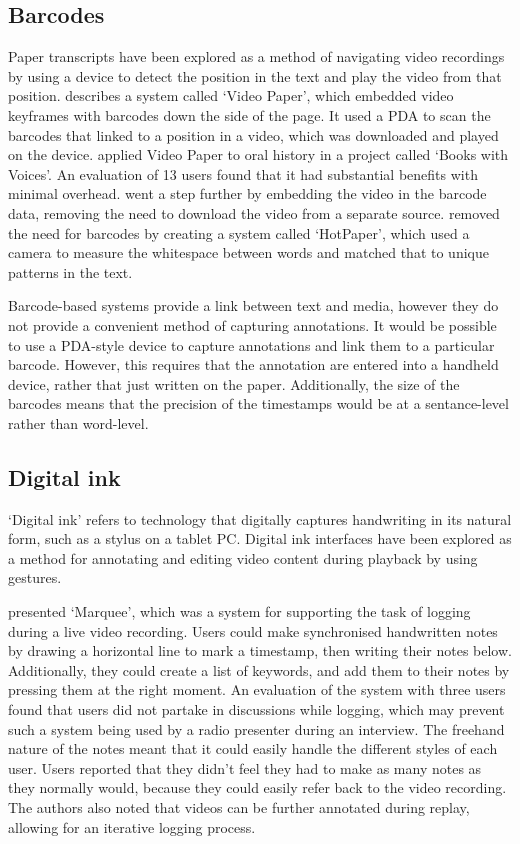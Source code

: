 \subsection{Barcodes}
Paper transcripts have been explored as a method of navigating video recordings by using a device to detect the
position in the text and play the video from that position. \citet{Hull2003} describes a system called `Video Paper',
which embedded video keyframes with barcodes down the side of the page. It used a PDA to scan the barcodes that linked
to a position in a video, which was downloaded and played on the device. \citet{Klemmer2003} applied Video Paper to
oral history in a project called `Books with Voices'. An evaluation of 13 users found that it had substantial benefits
with minimal overhead.  \citet{Erol2007} went a step further by embedding the video in the barcode data, removing the
need to download the video from a separate source. \citet{Erol2008} removed the need for barcodes by creating a system
called `HotPaper', which used a camera to measure the whitespace between words and matched that to unique patterns in
the text.

Barcode-based systems provide a link between text and media, however they do not provide a convenient method of
capturing annotations. It would be possible to use a PDA-style device to capture annotations and link them to a
particular barcode. However, this requires that the annotation are entered into a handheld device, rather that just
written on the paper. Additionally, the size of the barcodes means that the precision of the timestamps would be at a
sentance-level rather than word-level.

\subsection{Digital ink}
`Digital ink' refers to technology that digitally captures handwriting in its natural form, such as a
stylus on a tablet PC. Digital ink interfaces have been explored as a method for annotating and editing video content
during playback by using gestures.

\citet{Weher1994} presented `Marquee', which was a system for supporting the task of logging during a live video
recording. Users could make synchronised handwritten notes by drawing a horizontal line to mark a timestamp, then
writing their notes below.  Additionally, they could create a list of keywords, and add them to their notes by pressing
them at the right moment. An evaluation of the system with three users found that users did not partake in discussions
while logging, which may prevent such a system being used by a radio presenter during an interview.  The freehand
nature of the notes meant that it could easily handle the different styles of each user.  Users reported that they
didn't feel they had to make as many notes as they normally would, because they could easily refer back to the video
recording. The authors also noted that videos can be further annotated during replay, allowing for an iterative logging
process.

